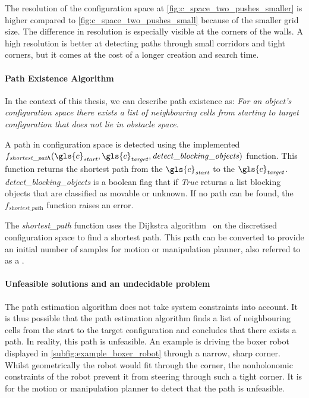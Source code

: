 The resolution of the configuration space at \cref{fig:c_space_two_pushes_smaller} is higher compared to \cref{fig:c_space_two_pushes_small} because of the smaller grid size. The difference in resolution is especially visible at the corners of the walls. A high resolution is better at detecting paths through small corridors and tight corners, but it comes at the cost of a longer creation and search time.

\paragraph{Path Existence Algorithm}
In the context of this thesis, we can describe path existence as: \textit{For an object's configuration space there exists a list of neighbouring cells from starting to target configuration that does not lie in obstacle space.\bs}

A path in configuration space is detected using the implemented\\$f_\mathit{shortest\_path}(\gls{c}_\mathit{start}, \gls{c}_\mathit{target}, \mathit{detect\_blocking\_objects})$ function. This function returns the shortest path from the $\gls{c}_\mathit{start}$ to the $\gls{c}_\mathit{target}$. \textit{detect\_blocking\_objects} is a boolean flag that if \textit{True} returns a list blocking objects that are classified as movable or unknown. If no path can be found, the $f_\textit{shortest\_path}$ function raises an error.\bs

The \textit{shortest\_path} function uses the Dijkstra algorithm~\cite{dijkstra_note_1959} on the discretised configuration space to find a shortest path. This path can be converted to provide an initial number of samples for motion or manipulation planner, also referred to as a .\bs

\paragraph{Unfeasible solutions and an undecidable problem}
The path estimation algorithm does not take system constraints into account. It is thus possible that the path estimation algorithm finds a list of neighbouring cells from the start to the target configuration and concludes that there exists a path. In reality, this path is unfeasible. An example is driving the boxer robot displayed in \cref{subfig:example_boxer_robot} through a narrow, sharp corner. Whilst geometrically the robot would fit through the corner, the nonholonomic constraints of the robot prevent it from steering through such a tight corner. It is for the motion or manipulation planner to detect that the path is unfeasible.\\

